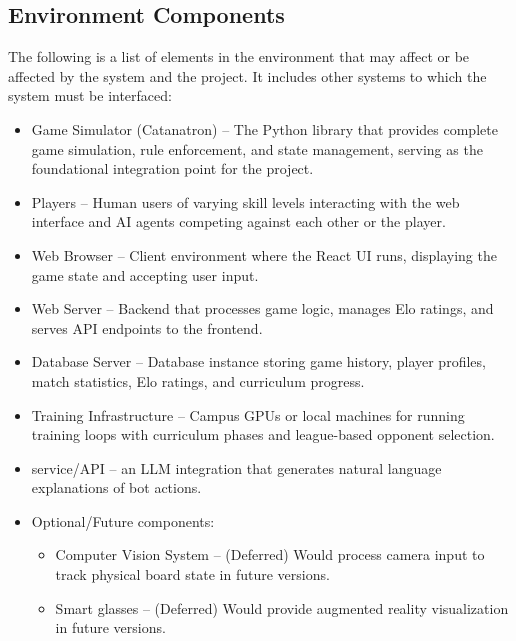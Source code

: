 \documentclass{article}
\begin{document}
\subsection{Environment Components}\label{subsec:components2}
\raggedright The following is a list of elements in the environment that may affect or be affected by the system and the project.
It includes other systems to which the system must be interfaced:
\begin{itemize}
    \item {Game Simulator (Catanatron)} – The Python library that provides complete \emph{\Catan{}} game simulation, rule enforcement, and state management, serving as the foundational integration point for the project.
    \item {Players} – Human users of varying skill levels interacting with the web interface and AI agents competing against each other or the player.
    \item {Web Browser} – Client environment where the React UI runs, displaying the game state and accepting user input.
    \item {Web Server} – Backend that processes game logic, manages Elo ratings, and serves API endpoints to the frontend.
    \item {Database Server} – Database instance storing game history, player profiles, match statistics, Elo ratings, and curriculum progress.
    \item {Training Infrastructure} – Campus GPUs or local machines for running \RL{} training loops with curriculum phases and league-based opponent selection.
    \item {\LLM{} service/API} – an LLM integration that generates natural language explanations of bot actions.
    \item {Optional/Future components:}
    \begin{itemize}
        \item {Computer Vision System} – (Deferred) Would process camera input to track physical board state in future versions.
        \item {Smart glasses} – (Deferred) Would provide augmented reality visualization in future versions.
    \end{itemize}
\end{itemize}
\end{document}
